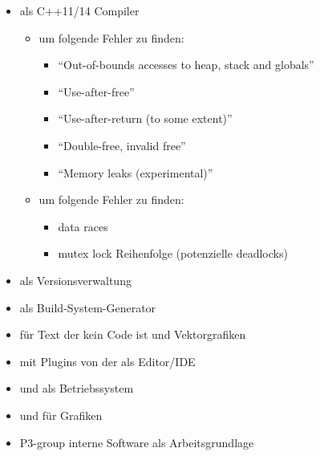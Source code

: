     \begin{itemize}
      \item {} als C++11/14 Compiler
        \begin{itemize}
          \item {} um folgende Fehler zu finden:
            \begin{itemize}
              \item ``Out-of-bounds accesses to heap, stack and globals''
              \item ``Use-after-free''
              \item ``Use-after-return (to some extent)''
              \item ``Double-free, invalid free''
              \item ``Memory leaks (experimental)''
            \end{itemize}
          \item {} um folgende Fehler zu finden:
            \begin{itemize}
              \item data races
              \item mutex lock Reihenfolge (potenzielle deadlocks)
             \end{itemize}
        \end{itemize}
      \item {} als Versionsverwaltung
      \item {} als Build-System-Generator
      \item {} für Text der kein Code ist und Vektorgrafiken
      \item {} mit Plugins von der  als Editor/IDE
      \item {} und  als Betriebssystem
      \item {} und  für Grafiken
      \item P3-group interne Software als Arbeitsgrundlage
    \end{itemize}

